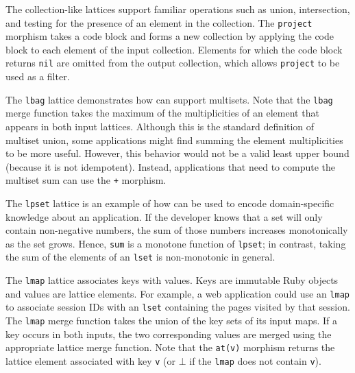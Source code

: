 The collection-like lattices support familiar operations such as union,
intersection, and testing for the presence of an element in the collection. The
\texttt{project} morphism takes a code block and forms a new collection by
applying the code block to each element of the input collection. Elements for
which the code block returns \texttt{nil} are omitted from the output
collection, which allows \texttt{project} to be used as a filter.

The \texttt{lbag} lattice demonstrates how \lang can support multisets. Note
that the \texttt{lbag} merge function takes the maximum of the multiplicities of
an element that appears in both input lattices. Although this is the standard
definition of multiset union, some applications might find summing the element
multiplicities to be more useful. However, this behavior would not be a valid
least upper bound (because it is not idempotent). Instead, applications that
need to compute the multiset sum can use the \texttt{+} morphism.

The \texttt{lpset} lattice is an example of how \lang can be used to encode
domain-specific knowledge about an application. If the developer knows that a
set will only contain non-negative numbers, the sum of those numbers increases
monotonically as the set grows. Hence, \texttt{sum} is a monotone function of
\texttt{lpset}; in contrast, taking the sum of the elements of an \texttt{lset}
is non-monotonic in general.

The \texttt{lmap} lattice associates keys with values. Keys are immutable Ruby
objects and values are lattice elements. For example, a web application could
use an \texttt{lmap} to associate session IDs with an \texttt{lset} containing
the pages visited by that session. The \texttt{lmap} merge function takes the
union of the key sets of its input maps. If a key occurs in both inputs, the two
corresponding values are merged using the appropriate lattice merge
function. Note that the \texttt{at(v)} morphism returns the lattice element
associated with key \texttt{v} (or $\bot$ if the \texttt{lmap} does not contain
\texttt{v}).

